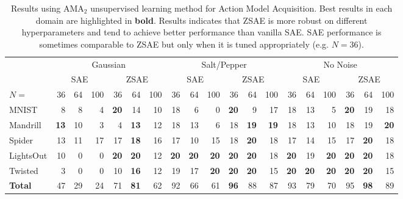 \begin{table}[htbp]
\centering
\setlength{\tabcolsep}{0.2em}
\begin{tabular}{|l|*{3}{r}|*{3}{r}|*{3}{r}|*{3}{r}|*{3}{r}|*{3}{r}|}
 & \multicolumn{6}{c|}{Gaussian} & \multicolumn{6}{c|}{Salt/Pepper} & \multicolumn{6}{c|}{No Noise}                                                                                    \\
 & \multicolumn{3}{c|}{SAE}     & \multicolumn{3}{c|}{ZSAE}      & \multicolumn{3}{c|}{SAE} & \multicolumn{3}{c|}{ZSAE} & \multicolumn{3}{c|}{SAE} & \multicolumn{3}{c|}{ZSAE} \\
$N=$ & {36} & {64} & {100} & {36} & {64} & {100} & {36} & {64} & {100} & {36} & {64} & {100} & {36} & {64} & {100} & {36} & {64} & {100} \\
\hline
MNIST     & 8           & 8  & 4  & \textbf{20} & 14          & 10 & 18          & 6           & 0           & \textbf{20} & 9           & 17          & 18          & 13          & 5           & \textbf{20} & 19          & 18          \\
Mandrill  & \textbf{13} & 10 & 3  & 4           & \textbf{13} & 12 & 18          & 13          & 6           & 18          & \textbf{19} & \textbf{19} & 18          & 13          & 10          & 18          & 19          & \textbf{20} \\
Spider    & 13          & 11 & 17 & 17          & \textbf{18} & 16 & 17          & 10          & 15          & 18          & \textbf{20} & 18          & 17          & 14          & 15          & 17          & \textbf{20} & 18          \\
LightsOut & 10          & 0  & 0  & \textbf{20} & \textbf{20} & 12 & \textbf{20} & \textbf{20} & \textbf{20} & \textbf{20} & \textbf{20} & 18          & \textbf{20} & 19          & \textbf{20} & \textbf{20} & \textbf{20} & 18          \\
Twisted   & 3           & 0  & 0  & 10          & \textbf{16} & 12 & 19          & 17          & \textbf{20} & \textbf{20} & \textbf{20} & 15          & \textbf{20} & \textbf{20} & \textbf{20} & \textbf{20} & \textbf{20} & 15          \\
\hline
\textbf{Total} & {47} & {29} & {24}  & {71} & \textbf{81} & {62}  & {92} & {66} & {61}  & \textbf{96} & {88} & {87}  & {93} & {79} & {70}  & {95} & \textbf{98} & {89}  \\
\hline
\end{tabular}
\caption{
Results using AMA$_2$ unsupervised learning method for Action Model Acquisition.
Best results in each domain are highlighted in \textbf{bold}.
Results indicates that ZSAE is more robust on different hyperparameters and tend to achieve better performance than vanilla SAE.
SAE performance is sometimes comparable to ZSAE but only when it is tuned appropriately (e.g. $N=36$).
}
 \label{tab:ama2}
\end{table}

